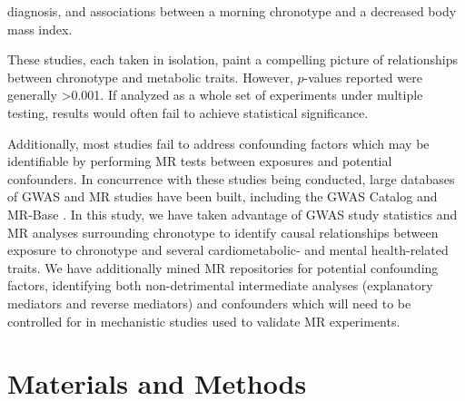 \documentclass[genes,article,accept,moreauthors,pdftex]{Definitions/mdpi}
\begin{document}
diagnosis, and associations between a morning chronotype and a decreased body mass index. 

These studies, each taken in isolation, paint a compelling picture of relationships between chronotype and metabolic traits. However, $p$-values reported were generally >0.001. If analyzed as a whole set of experiments under multiple testing, results would often fail to achieve statistical significance. 

Additionally, most studies fail to address confounding factors which may be identifiable by performing MR tests between exposures and potential confounders. In concurrence with these studies being conducted, large databases of GWAS and MR studies have been built, including the GWAS Catalog \cite{buniello_nhgri-ebi_2019} and MR-Base \cite{hemani_mr-base_2018}. In this study, we have taken advantage of GWAS study statistics and MR analyses surrounding chronotype to identify causal relationships between exposure to chronotype and several cardiometabolic- and mental health-related traits. We have additionally mined MR repositories for potential confounding factors, identifying both non-detrimental intermediate analyses (explanatory mediators and reverse mediators) and confounders which will need to be controlled for in mechanistic studies used to validate MR experiments.

\section{Materials and Methods}
\end{document}
